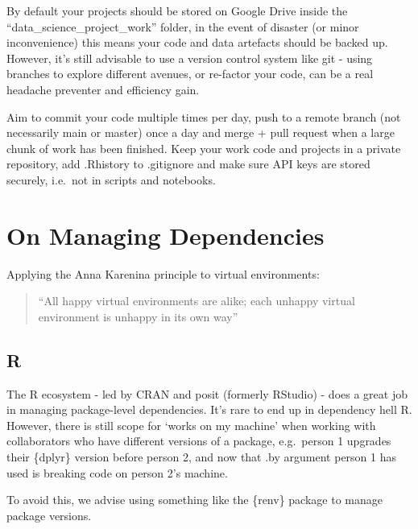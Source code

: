 \documentclass[
  letterpaper,
  DIV=11,
  numbers=noendperiod]{scrreprt}
\begin{document}
By default your projects should be stored on Google Drive inside the
``data\_science\_project\_work'' folder, in the event of disaster (or
minor inconvenience) this means your code and data artefacts should be
backed up. However, it's still advisable to use a version control system
like git - using branches to explore different avenues, or re-factor
your code, can be a real headache preventer and efficiency gain.

Aim to commit your code multiple times per day, push to a remote branch
(not necessarily main or master) once a day and merge + pull request
when a large chunk of work has been finished. Keep your work code and
projects in a private repository, add .Rhistory to .gitignore and make
sure API keys are stored securely, i.e.~not in scripts and notebooks.

\section{On Managing Dependencies}\label{on-managing-dependencies}

Applying the Anna Karenina principle to virtual environments:

\begin{quote}
``All happy virtual environments are alike; each unhappy virtual
environment is unhappy in its own way''
\end{quote}

\subsection{R}\label{r-1}

The R ecosystem - led by CRAN and posit (formerly RStudio) - does a
great job in managing package-level dependencies. It's rare to end up in
dependency hell R. However, there is still scope for `works on my
machine' when working with collaborators who have different versions of
a package, e.g.~person 1 upgrades their \{dplyr\} version before person
2, and now that .by argument person 1 has used is breaking code on
person 2's machine.

To avoid this, we advise using something like the \{renv\} package to
manage package versions.
\end{document}
